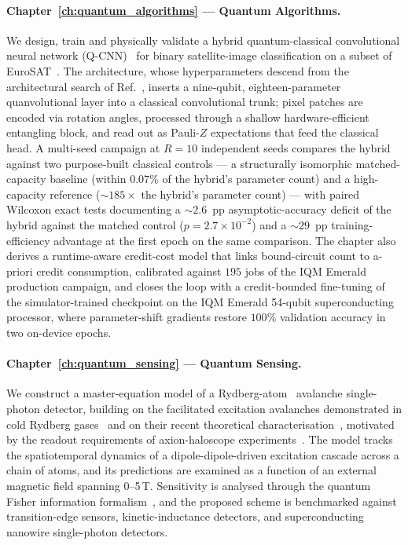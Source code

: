\paragraph{Chapter~\ref{ch:quantum_algorithms} --- Quantum Algorithms.}
We design, train and physically validate a hybrid quantum-classical
convolutional neural network (Q-CNN)~\cite{Mitarai2018, Sebastianelli2021}
for binary satellite-image classification on a subset of
EuroSAT~\cite{Helber2019}. The architecture, whose hyperparameters descend
from the architectural search of Ref.~\cite{Filippi2025Thesis}, inserts a
nine-qubit, eighteen-parameter quanvolutional layer into a classical
convolutional trunk; pixel patches are encoded via rotation angles,
processed through a shallow hardware-efficient entangling block, and
read out as Pauli-$Z$ expectations that feed the classical head.
A multi-seed campaign at $R=10$ independent seeds compares the hybrid
against two purpose-built classical controls --- a structurally
isomorphic matched-capacity baseline (within $0.07\%$ of the hybrid's
parameter count) and a high-capacity reference ($\sim 185\times$ the
hybrid's parameter count) --- with paired Wilcoxon exact tests
documenting a $\sim 2.6$~pp asymptotic-accuracy deficit of the
hybrid against the matched control ($p=2.7\times 10^{-2}$) and a
$\sim 29$~pp training-efficiency advantage at the first epoch on the
same comparison. The chapter also derives a runtime-aware credit-cost
model that links bound-circuit count to a-priori credit consumption,
calibrated against $195$ jobs of the IQM Emerald production campaign,
and closes the loop with a credit-bounded fine-tuning of the
simulator-trained checkpoint on the IQM Emerald 54-qubit
superconducting processor, where parameter-shift gradients restore
$100\%$ validation accuracy in two on-device epochs.

\paragraph{Chapter~\ref{ch:quantum_sensing} --- Quantum Sensing.}
We construct a master-equation model of a Rydberg-atom~\cite{Saffman2010,
Adams2020} avalanche single-photon detector, building on the facilitated
excitation avalanches demonstrated in cold Rydberg
gases~\cite{Valado2016, Simonelli2016} and on their recent theoretical
characterisation~\cite{Nill2024}, motivated by the readout requirements of
axion-haloscope experiments~\cite{Sikivie1983, Lamoreaux2013}.  The model
tracks the spatiotemporal dynamics of a dipole-dipole-driven excitation
cascade across a chain of atoms, and its predictions are examined as a
function of an external magnetic field spanning 0--5\,T.  Sensitivity is
analysed through the quantum Fisher information
formalism~\cite{Giovannetti2011, Degen2017}, and the proposed scheme is
benchmarked against transition-edge sensors, kinetic-inductance
detectors, and superconducting nanowire single-photon detectors.

